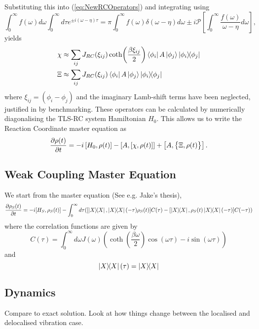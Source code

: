 \documentclass[]{article}
\begin{document}
Substituting this into (\ref{eq:NewRCOperators}) and integrating using 
\begin{equation}
	\label{eq:Sokhotski}
	\int_{0}^{\infty}f(\omega)d\omega\int_{0}^{\infty}d\tau e^{\pm i(\omega-\eta)\tau} = \pi\int_{0}^{\infty}f(\omega)\delta(\omega-\eta)d\omega \pm i \mathcal{P}\left[\int_{0}^{\infty}\frac{f(\omega)}{\omega-\eta}d\omega\right],
\end{equation}
yields
\begin{align}
	\label{eq:NewRCOperatorsDiscrete}
	\chi &\approx \sum_{ij}J_{RC}(\xi_{ij}) \coth(\frac{\beta \xi_{ij}}{2})\bra{\phi_i}A\ket{\phi_j}\dyad{\phi_i}{\phi_j}\\
	\Xi &\approx \sum_{ij}J_{RC}(\xi_{ij}) \bra{\phi_i}A\ket{\phi_j}\dyad{\phi_i}{\phi_j}
\end{align}
where $\xi_{ij} = (\phi_i-\phi_j)$ and the imaginary Lamb-shift terms have been neglected, justified in by benchmarking. These operators can be calculated by numerically diagonalising the TLS-RC system Hamiltonian $H_0$. This allows us to write the Reaction Coordinate master equation as
\begin{equation}
\pdv{\rho(t)}{t} = -i\left[H_0, \rho(t)\right] - \left[A, \left[\chi, \rho(t)\right]\right] + \left[A, \big\lbrace\Xi, \rho(t)\big\rbrace\right].
\end{equation}
\subsection{Weak Coupling Master Equation}
We start from the master equation (See e.g. Jake's thesis),
\begin{equation}
\pdv{\rho_S(t)}{t} = -i[H_S, \rho_S(t)] - \int_{0}^{\infty}d\tau([\dyad{X}, \dyad{X}(-\tau)\rho_S(t)]C(\tau) - [\dyad{X}, \rho_S(t)\dyad{X}(-\tau)]C(-\tau))
\end{equation}
where the correlation functions are given by 
\begin{equation}
C(\tau) = \int_{0}^{\infty}d\omega J(\omega)\left(\coth(\frac{\beta\omega}{2})\cos(\omega \tau) - i\sin(\omega\tau)\right)
\end{equation}
and 
\begin{equation}
\dyad{X}(\tau) = \dyad{X}
\end{equation}

\subsection{Dynamics}
Compare to exact solution. Look at how things change between the localised and delocalised vibration case.
\end{document}
